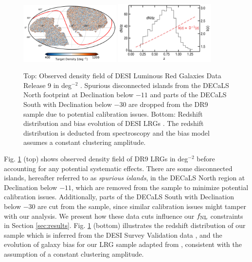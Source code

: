 \begin{figure}
    \centering
    \includegraphics[width=0.45\textwidth]{figures/lrgdens.pdf}
    \includegraphics[width=0.45\textwidth]{figures/nz_lrg.pdf}
    \caption{Top: Observed density field of DESI Luminous Red Galaxies Data Release 9  in deg$^{-2}$ . Spurious disconnected islands from the DECaLS North footprint at Declination below $-11$ and parts of the DECaLS South with Declination below $-30$ are dropped from the DR9 sample due to potential calibration issues. Bottom: Redshift distribution and bias evolution of DESI LRGs \citep{zhou2021clustering, zhou2022target} . The redshift distribution is deducted from spectroscopy and the bias model assumes a constant clustering amplitude.}
    \label{fig:ng}
\end{figure}

Fig. \ref{fig:ng} (top) shows observed density field of DR9 LRGs in deg$^{-2}$ before accounting for any potential systematic effects. There are some disconnected islands, hereafter referred to as \textit{spurious islands}, in the DECaLS North region at Declination below $-11$, which are removed from the sample to minimize potential calibration issues. Additionally, parts of the DECaLS South with Declination below $-30$ are cut from the sample, since similar calibration issues might tamper with our analysis. We present  how these data cuts influence our $f_{\rm NL}$ constraints in Section \ref{sec:results}. Fig. \ref{fig:ng} (bottom) illustrates the redshift distribution of our sample which is inferred from the DESI Survey Validation data , and the evolution of  galaxy bias for our LRG sample adapted from \cite{zhou2021clustering}, consistent with the assumption of a constant clustering amplitude.

